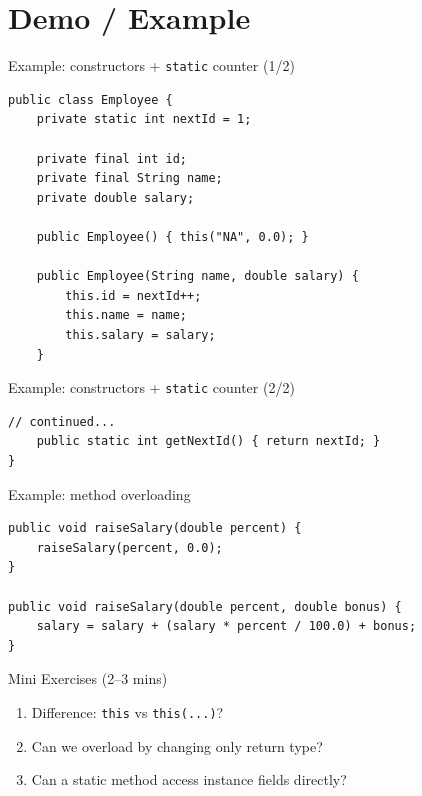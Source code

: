 \documentclass{beamer}
\begin{document}
\section{Demo / Example}
\label{sec:demo}

\begin{frame}[fragile,shrink=8]{Example: constructors + \texttt{static} counter (1/2)}
\begin{lstlisting}
public class Employee {
    private static int nextId = 1;

    private final int id;
    private final String name;
    private double salary;

    public Employee() { this("NA", 0.0); }

    public Employee(String name, double salary) {
        this.id = nextId++;
        this.name = name;
        this.salary = salary;
    }
\end{lstlisting}
  \slidesources{\OOPSUnitIISources}
\end{frame}

\begin{frame}[fragile]{Example: constructors + \texttt{static} counter (2/2)}
\begin{lstlisting}
// continued...
    public static int getNextId() { return nextId; }
}
\end{lstlisting}
  \slidesources{\OOPSUnitIISources}
\end{frame}

\begin{frame}[fragile]{Example: method overloading}
\begin{lstlisting}
public void raiseSalary(double percent) {
    raiseSalary(percent, 0.0);
}

public void raiseSalary(double percent, double bonus) {
    salary = salary + (salary * percent / 100.0) + bonus;
}
\end{lstlisting}
  \slidesources{\OOPSUnitIISources}
\end{frame}

\begin{frame}{Mini Exercises (2--3 mins)}
  \begin{enumerate}[<+->]
    \item Difference: \texttt{this} vs \texttt{this(...)}?
    \item Can we overload by changing only return type?
    \item Can a static method access instance fields directly?
  \end{enumerate}
  \slidesources{\OOPSUnitIISources}
\end{frame}
\end{document}
